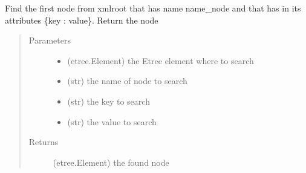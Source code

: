 \documentclass[a4paper,10pt,english]{sphinxmanual}
\begin{document}
\begin{fulllineitems}
\label{\detokenize{apidoc_src/src:src.xmlManager.find_node_by_attrib}}
Find the first node from xmlroot that has name name\_node 
and that has in its attributes \{key : value\}. 
Return the node
\begin{quote}\begin{description}
\item[{Parameters}] \leavevmode\begin{itemize}
\item {} 
 \textendash{} (etree.Element) 
the Etree element where to search

\item {} 
 \textendash{} (str) the name of node to search

\item {} 
 \textendash{} (str) the key to search

\item {} 
 \textendash{} (str) the value to search

\end{itemize}

\item[{Returns}] \leavevmode
(etree.Element) the found node

\end{description}\end{quote}

\end{fulllineitems}

\end{document}
